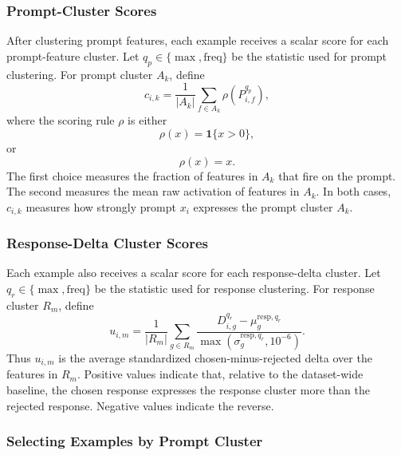 \documentclass{article} %
\begin{document}
\subsubsection{Prompt-Cluster Scores}
\label{app:pcfs-prompt-scores}

After clustering prompt features, each example receives a scalar score for each prompt-feature cluster. Let $q_p \in \{\max,\text{freq}\}$ be the statistic used for prompt clustering. For prompt cluster $A_k$, define
\begin{equation}
c_{i,k} = \frac{1}{|A_k|}\sum_{f \in A_k}\rho(P^{q_p}_{i,f}),
\end{equation}
where the scoring rule $\rho$ is either
\begin{equation}
\rho(x)=\mathbf{1}\{x>0\},
\end{equation}
or
\begin{equation}
\rho(x)=x.
\end{equation}
The first choice measures the fraction of features in $A_k$ that fire on the prompt. The second measures the mean raw activation of features in $A_k$. In both cases, $c_{i,k}$ measures how strongly prompt $x_i$ expresses the prompt cluster $A_k$.

\subsubsection{Response-Delta Cluster Scores}
\label{app:pcfs-response-scores}

Each example also receives a scalar score for each response-delta cluster. Let $q_r \in \{\max,\text{freq}\}$ be the statistic used for response clustering. For response cluster $R_m$, define
\begin{equation}
u_{i,m} = \frac{1}{|R_m|}\sum_{g \in R_m}\frac{D^{q_r}_{i,g} - \mu^{\text{resp},q_r}_g}{\max(\sigma^{\text{resp},q_r}_g,10^{-6})}.
\end{equation}
Thus $u_{i,m}$ is the average standardized chosen-minus-rejected delta over the features in $R_m$. Positive values indicate that, relative to the dataset-wide baseline, the chosen response expresses the response cluster more than the rejected response. Negative values indicate the reverse.

\subsubsection{Selecting Examples by Prompt Cluster}
\label{app:pcfs-selecting-examples}
\end{document}
